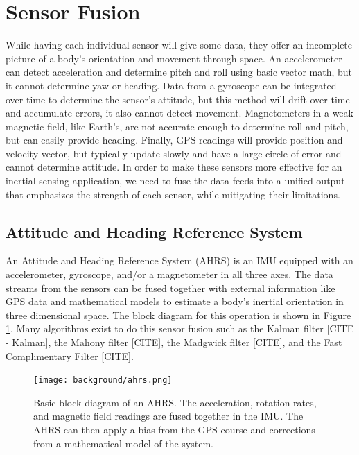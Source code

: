 \section{Sensor Fusion} \label{sec:bkg_sensor_fusion}
While having each individual sensor will give some data, they offer an incomplete picture of a body's orientation and movement through space.
An accelerometer can detect acceleration and determine pitch and roll using basic vector math, but it cannot determine yaw or heading.
Data from a gyroscope can be integrated over time to determine the sensor's attitude, but this method will drift over time and accumulate errors, it also cannot detect movement.
Magnetometers in a weak magnetic field, like Earth's, are not accurate enough to determine roll and pitch, but can easily provide heading.
Finally, GPS readings will provide position and velocity vector, but typically update slowly and have a large circle of error and cannot determine attitude.
In order to make these sensors more effective for an inertial sensing application, we need to fuse the data feeds into a unified output that emphasizes the strength of each sensor, while mitigating their limitations.

\subsection{Attitude and Heading Reference System} \label{ssec:bkg_ahrs}
An Attitude and Heading Reference System (AHRS) is an IMU equipped with an accelerometer, gyroscope, and/or a magnetometer in all three axes.
The data streams from the sensors can be fused together with external information like GPS data and mathematical models to estimate a body's inertial orientation in three dimensional space.
The block diagram for this operation is shown in Figure \ref{fig:ahrs_design}.
Many algorithms exist to do this sensor fusion such as the Kalman filter [CITE - Kalman], the Mahony filter [CITE], the Madgwick filter [CITE], and the Fast Complimentary Filter [CITE].

\begin{figure}[h!]
    \caption[AHRS block diagram]{Basic block diagram of an AHRS. 
    The acceleration, rotation rates, and magnetic field readings are fused together in the IMU. 
    The AHRS can then apply a bias from the GPS course and corrections from a mathematical model of the system.}
    \label{fig:ahrs_design}
    \centering
    \texttt{[image: background/ahrs.png]}
\end{figure}

